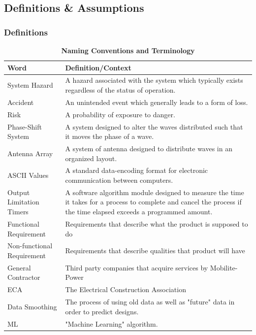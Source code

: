 \documentclass[12pt, titlepage]{article}
\begin{document}
\subsection{Definitions \& Assumptions}

\subsubsection{Definitions}
\begin{table}[H]
\caption{\bf Naming Conventions and Terminology}
\begin{tabular}{ |p{6cm}|p{8cm}|  } 
 \hline
\bf Word & \bf Definition/Context\\
 \hline
 System Hazard & A hazard associated with the system which typically exists regardless of the status of operation.\\
 \hline
 Accident & An unintended event  which generally leads to a form of loss.\\
 \hline
 Risk & A probability of exposure to danger.\\
 \hline
 Phase-Shift System & A system designed to alter the waves distributed such that it moves the phase of a wave.\\
 \hline
 Antenna Array & A system of antenna designed to distribute waves in an organized layout.\\
 \hline
 ASCII Values & A standard data-encoding format for electronic communication between computers.\\
 \hline
 Output Limitation Timers & A software algorithm module designed to measure the time it takes for a process to complete and cancel the process if the time elapsed exceeds a programmed amount.\\
 \hline
 Functional Requirement & Requirements that describe what the product is supposed to do\\
 \hline
Non-functional Requirement & Requirements that describe qualities that product will have\\
 \hline
General Contractor & Third party companies that acquire services by Mobilite-Power\\
  \hline
ECA & The Electrical Construction Association\\
\hline
Data Smoothing & The process of using old data as well as "future" data in order to predict designs.\\
\hline
ML & "Machine Learning" algorithm.\\
\hline
\end{tabular}
\end{table}
\end{document}
